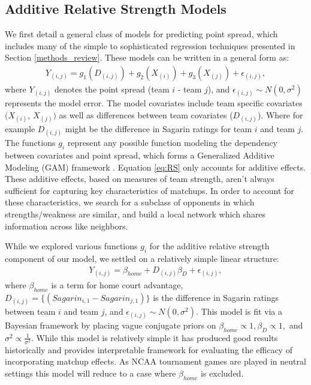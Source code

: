 \documentclass[letterpaper,12pt]{article}
\begin{document}
\subsection{Additive Relative Strength Models \label{sec:AS}}
We first detail a general class of models for predicting point spread, which includes many of the simple to sophisticated regression techniques presented in Section \ref{methods_review}. These models can be written in a general form as:
\begin{eqnarray}
Y_{(i,j)} = g_1(D_{(i,j)}) + g_2(X_{(i)}) + g_3(X_{(j)}) +  \epsilon_{(i,j)},
\label{eq:RS}
\end{eqnarray}
where $Y_{(i,j)}$ denotes the point spread (team $i$ - team $j$), and $\epsilon_{(i,j)}\sim N(0,\sigma^2)$ represents the model error. The model covariates include team specific covariates $(X_{(i)}$, $X_{(j)})$ as well as differences between team covariates ($D_{(i,j)}$). Where for example $D_{(i,j)}$ might be the difference in Sagarin ratings for team $i$ and team $j$. The functions $g_i$ represent any possible function modeling the dependency between covariates and point spread, which forms a Generalized Additive Modeling (GAM) framework \citep{GAMs}. Equation \ref{eq:RS} only accounts for additive effects. These additive effects, based on measures of team strength, aren't always sufficient for capturing key characteristics of matchups. In order to account for these characteristics, we search for a subclass of opponents in which strengths/weakness are similar, and build a local network which shares information across like neighbors.  

While we explored various functions $g_i$ for the additive relative strength component of our model, we settled on a relatively simple linear structure:
\begin{eqnarray}
Y_{(i,j)} =  \beta_{home} + D_{(i,j)}\beta_D +  \epsilon_{(i,j)},
\label{eq:RS2}
\end{eqnarray}
where $\beta_{home}$ is a term for home court advantage, $D_{(i,j)}=\{(Sagarin_{i,1} - Sagarin_{j,1})\}$ is the difference in Sagarin ratings between team $i$ and team $j$, and $\epsilon_{(i,j)} \sim N(0,\sigma^2).$ This model is fit via a Bayesian framework by placing vague conjugate priors on $\beta_{home}\propto 1, \beta_D \propto 1,$ and $ \sigma^2 \propto \frac{1}{\sigma^2}$. While this model is relatively simple it has produced good results historically \citep{carlin1996} and provides interpretable framework for evaluating the efficacy of incorporating matchup effects. As NCAA tournament games are played in neutral settings this model will reduce to a case where $\beta_{home}$ is excluded.
\end{document}
